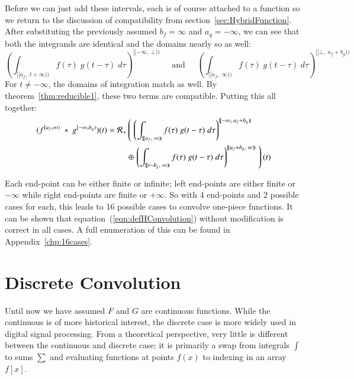 Before we can just add these intervals, each is of course attached to a function so we return to the discussion of compatibility
from section~\ref{sec:HybridFunction}.
After substituting the previously assumed $b_f = \infty$ and $a_g=-\infty$, we can see that both the integrands are
identical and the domains nearly so as well:
\begin{equation*}
	\left( \int_{[\![a_f,\;t+\infty)\!)} f(\tau) \; g(t-\tau) \; d\tau \right)^{[\![-\infty,\; \bot )\!)} 
		\;\;\;\;\;
		\text{and}
		\;\;\;\;\;
	\left( \int_{[\![a_f,\;\infty)\!)} f(\tau) \; g(t-\tau) \; d\tau \right)^{[\![\bot,\; a_f+b_g)\!)} 
\end{equation*}
For $t \neq -\infty$, the domains of integration match as well.
By theorem~\ref{thm:reducible1}, these two terms are compatible.
Putting this all together:
\begin{align}
	(f^{[a_f,\infty)} \;*\; g^{[-\infty,b_g)}) (t) = 
		\R[+] &\left( \; \left( 
			\int_{[\![a_f,\;\infty)\!)} f(\tau) \; g(t-\tau) \; d\tau \right)^{[\![-\infty,\; a_f+b_g)\!)} 
				\right. \notag \\ &\oplus \left. \left( 
			\int_{[\![t-b_g,\;\infty)\!)} f(\tau) \; g(t-\tau) \; d\tau \right)^{[\![a_f+b_g,\; \infty)\!)} 
				\; \right)(t)
\end{align}


Each end-point can be either finite or infinite; left end-points are either finite or $-\infty$ while right end-points are finite
or $+\infty$.
So with 4 end-points and 2 possible cases for each, this leads to 16 possible cases to convolve one-piece functions.
It can be shown that equation~(\ref{eqn:defHConvolution}) without modification is correct in all cases.
A full enumeration of this can be found in Appendix~\ref{chp:16cases}.

%
%
\section{Discrete Convolution}

Until now we have assumed $F$ and $G$ are continuous functions. 
While the continuous is of more historical interest, the discrete case is more widely used in digital signal processing.
From a theoretical perspective, very little is different between the continuous and discrete case; it is primarily a swap
from integrals $\int$ to sums $\sum$ and evaluating functions at points $f(x)$ to indexing in an array $f[x]$.

